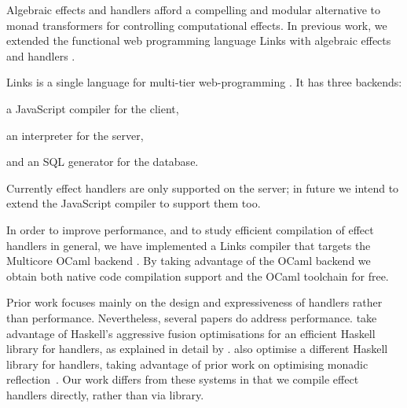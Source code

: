\documentclass[preprint,numbers]{sigplanconf}
\newcommand{\msgbox}[2]{{%
  \par\noindent\small\color{red}%
  \framebox{\parbox{\dimexpr\linewidth-2\fboxsep-2\fboxrule}{\textbf{#1:} #2}}%
}}
\newcommand{\kc}[1]{\msgbox{KC}{#1}}
\begin{document}
Algebraic effects and handlers \cite{Plotkin2013} afford a compelling
and modular alternative to monad transformers for controlling
computational effects. In previous work, we extended the functional
web programming language Links with algebraic effects and handlers
\cite{Hillerstrom2015,Hillerstrom2016}.

Links is a single language for multi-tier web-programming
\cite{Cooper2006}. It has three backends:
\begin{enumerate*}[label={\roman*)}]
 \item a JavaScript compiler for the client,
 \item an interpreter for the server,
 \item and an SQL generator for the database.
\end{enumerate*}
Currently effect handlers are only supported on the server; in future
we intend to extend the JavaScript compiler to support them too.

In order to improve performance, and to study efficient compilation of effect
handlers in general, we have implemented a Links compiler that targets the
Multicore OCaml backend \cite{Dolan2015}. By taking advantage of the OCaml
backend we obtain both native code compilation support and the OCaml toolchain
for free.


Prior work focuses mainly on the design and expressiveness of handlers
rather than performance. Nevertheless, several papers do address
performance. \citet{Kammar2013} take advantage of Haskell's aggressive
fusion optimisations for an efficient Haskell library for handlers, as
explained in detail by \citet{Wu2015}. \citet{Kiselyov2015} also
optimise a different Haskell library for handlers, taking advantage of
prior work on optimising monadic reflection~\citep{PloegK14}.  Our
work differs from these systems in that we compile effect handlers
directly, rather than via library.


\end{document}
